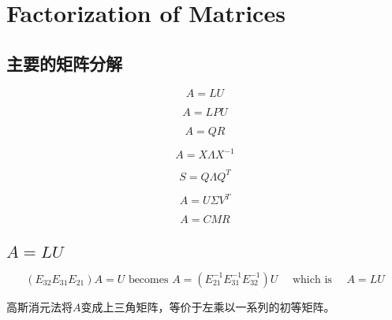 \chapter{Factorization of Matrices}

\section{主要的矩阵分解}

$$A = LU$$

$$A = LPU$$

$$A = QR$$

$$A = X \Lambda X^{-1}$$

$$S = Q \Lambda Q^T$$

$$A = U \Sigma V^T$$

$$A = CMR$$

\section{$A=LU$}

$$
\left(E_{32} E_{31} E_{21}\right) A=U \text { becomes } A=\left(E_{21}^{-1} E_{31}^{-1} E_{32}^{-1}\right) U \quad \text { which is } \quad A=L U
$$

高斯消元法将$A$变成上三角矩阵，等价于左乘以一系列的初等矩阵。